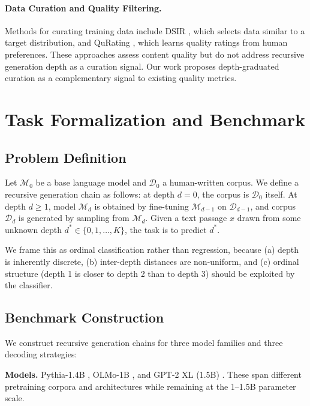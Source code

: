 \documentclass[11pt,a4paper]{article}
\begin{document}
\paragraph{Data Curation and Quality Filtering.}
Methods for curating training data include DSIR \citep{xie2023dsir}, which selects data similar to a target distribution, and QuRating \citep{wettig2024qurating}, which learns quality ratings from human preferences. These approaches assess content quality but do not address recursive generation depth as a curation signal. Our work proposes depth-graduated curation as a complementary signal to existing quality metrics.

\section{Task Formalization and Benchmark}
\label{sec:task}

\subsection{Problem Definition}

Let $\mathcal{M}_0$ be a base language model and $\mathcal{D}_0$ a human-written corpus. We define a recursive generation chain as follows: at depth $d{=}0$, the corpus is $\mathcal{D}_0$ itself. At depth $d \geq 1$, model $\mathcal{M}_d$ is obtained by fine-tuning $\mathcal{M}_{d-1}$ on $\mathcal{D}_{d-1}$, and corpus $\mathcal{D}_d$ is generated by sampling from $\mathcal{M}_d$. Given a text passage $x$ drawn from some unknown depth $d^* \in \{0, 1, \ldots, K\}$, the task is to predict $d^*$.

We frame this as ordinal classification rather than regression, because (a) depth is inherently discrete, (b) inter-depth distances are non-uniform, and (c) ordinal structure (depth 1 is closer to depth 2 than to depth 3) should be exploited by the classifier.

\subsection{Benchmark Construction}

We construct recursive generation chains for three model families and three decoding strategies:

\textbf{Models.} Pythia-1.4B \citep{biderman2023pythia}, OLMo-1B \citep{groeneveld2024olmo}, and GPT-2 XL (1.5B) \citep{radford2019language}. These span different pretraining corpora and architectures while remaining at the 1--1.5B parameter scale.
\end{document}
